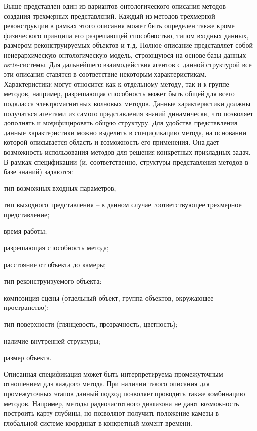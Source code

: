 Выше представлен один из вариантов онтологического описания методов создания трехмерных представлений. Каждый из методов трехмерной реконструкции в рамках этого описания может быть определен также кроме физического принципа его разрешающей способностью, типом входных данных, размером реконструируемых объектов и т.д. Полное описание представляет собой неиерархическую онтологическую модель, строющуюся на основе базы данных ostis-системы. Для дальнейшего взаимодействия агентов с данной структурой все эти описания ставятся в соответствие некоторым характеристикам. Характеристики могут относится как к отдельному методу, так и к группе методов, например, разрешающая способность может быть общей для всего подкласса электромагнитных волновых методов. Данные характеристики должны получаться агентами из самого представления знаний динамически, что позволяет дополнять и модифицировать общую структуру.
Для удобства представления данные характеристики можно выделить в спецификацию метода, на основании которой описывается область и возможность его применения. Она дает возможность использования методов для решения конкретных прикладных задач. В рамках спецификации (и, соответственно, структуры представления методов в базе знаний) задаются:
\begin{textitemize}
    \item тип возможных входных параметров,
    \item тип выходного представления -- в данном случае соответствующее трехмерное представление;
    \item время работы;
    \item разрешающая способность метода;
    \item расстояние от объекта до камеры;
    \item тип реконструируемого объекта:
    \item композиция сцены (отдельный объект, группа объектов, окружающее пространство);
    \item тип поверхности (глянцевость, прозрачность, цветность);
    \item наличие внутренней структуры;
    \item размер объекта.
\end{textitemize}

Описанная спецификация может быть интерпретируема промежуточным отношением для каждого метода. При наличии такого описания для промежуточных этапов данный подход позволяет проводить также комбинацию методов. Например, методы радиочастотного диапазона не дают возможность построить карту глубины, но позволяют получить положение камеры в глобальной системе координат в конкретный момент времени.


